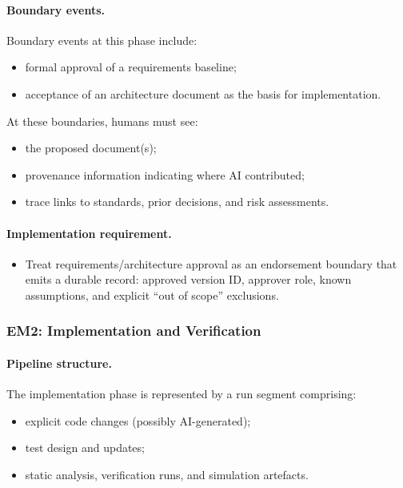 \paragraph{Boundary events.}
Boundary events at this phase include:

\begin{itemize}
  \item formal approval of a requirements baseline;
  \item acceptance of an architecture document as the basis for implementation.
\end{itemize}

At these boundaries, humans must see:

\begin{itemize}
  \item the proposed document(s);
  \item provenance information indicating where AI contributed;
  \item trace links to standards, prior decisions, and risk assessments.
\end{itemize}

\paragraph{Implementation requirement.}
\begin{itemize}
  \item Treat requirements/architecture approval as an endorsement boundary that emits a durable record:
        approved version ID, approver role, known assumptions, and explicit “out of scope” exclusions.
\end{itemize}
\subsubsection*{EM2: Implementation and Verification}

\paragraph{Pipeline structure.}
The implementation phase is represented by a run segment
comprising:

\begin{itemize}
  \item explicit code changes (possibly AI-generated);
  \item test design and updates;
  \item static analysis, verification runs, and simulation artefacts.
\end{itemize}


